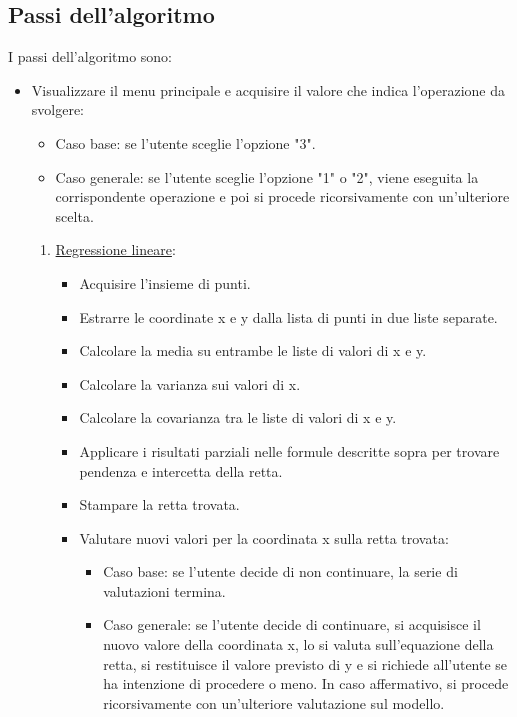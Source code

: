 \documentclass[11pt]{article}
\theoremstyle{definition}
\begin{document}
\subsection{Passi dell'algoritmo}
I passi dell'algoritmo sono:
\begin{itemize}
\item Visualizzare il menu principale e acquisire il valore che indica l'operazione da svolgere: 
\begin{itemize}
\item Caso base: se l'utente sceglie l'opzione "3".
\item Caso generale: se l'utente sceglie l'opzione "1" o "2", viene eseguita la corrispondente operazione e poi si procede ricorsivamente con un'ulteriore scelta.
\end{itemize}
\begin{enumerate}
\item \underline{Regressione lineare}: 
          \begin{itemize}
          \item Acquisire l'insieme di punti.
         \item Estrarre le coordinate x e y dalla lista di punti in due liste separate.
         \item Calcolare la media su entrambe le liste di valori di x e y.
         \item Calcolare la varianza sui valori di x.
         \item Calcolare la covarianza tra le liste di valori di x e y.
         \item Applicare i risultati parziali nelle formule descritte sopra per trovare pendenza e intercetta della retta.
         \item Stampare la retta trovata.
         \item Valutare nuovi valori per la coordinata x sulla retta trovata:
         \begin{itemize}
           \item Caso base: se l'utente decide di non continuare, la serie di valutazioni termina.
           \item Caso generale: se l'utente decide di continuare, si acquisisce il nuovo valore della coordinata x, lo si valuta sull'equazione della retta, si restituisce il valore previsto di y e si richiede all'utente se ha intenzione di procedere o meno. In caso affermativo, si procede ricorsivamente con un'ulteriore valutazione sul modello.
         \end{itemize}
       \end{itemize}

\end{enumerate}
\end{itemize}
\end{document}
